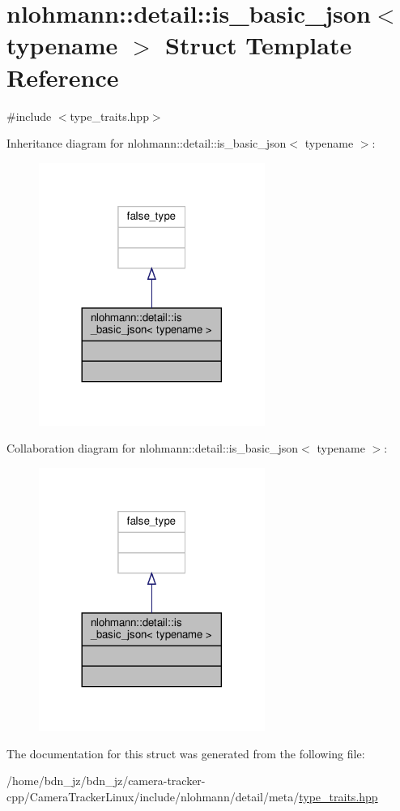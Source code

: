 \hypertarget{structnlohmann_1_1detail_1_1is__basic__json}{}\section{nlohmann\+:\+:detail\+:\+:is\+\_\+basic\+\_\+json$<$ typename $>$ Struct Template Reference}
\label{structnlohmann_1_1detail_1_1is__basic__json}


{\ttfamily \#include $<$type\+\_\+traits.\+hpp$>$}



Inheritance diagram for nlohmann\+:\+:detail\+:\+:is\+\_\+basic\+\_\+json$<$ typename $>$\+:
\nopagebreak
\begin{figure}[H]
\begin{center}
\leavevmode
\includegraphics[width=209pt]{structnlohmann_1_1detail_1_1is__basic__json__inherit__graph}
\end{center}
\end{figure}


Collaboration diagram for nlohmann\+:\+:detail\+:\+:is\+\_\+basic\+\_\+json$<$ typename $>$\+:
\nopagebreak
\begin{figure}[H]
\begin{center}
\leavevmode
\includegraphics[width=209pt]{structnlohmann_1_1detail_1_1is__basic__json__coll__graph}
\end{center}
\end{figure}


The documentation for this struct was generated from the following file\+:\begin{DoxyCompactItemize}
\item 
/home/bdn\+\_\+jz/bdn\+\_\+jz/camera-\/tracker-\/cpp/\+Camera\+Tracker\+Linux/include/nlohmann/detail/meta/\hyperlink{type__traits_8hpp}{type\+\_\+traits.\+hpp}\end{DoxyCompactItemize}
